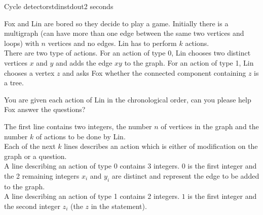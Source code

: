 \begin{problem}{Cycle detector}{stdin}{stdout}{2 seconds}


%

Fox and Lin are bored so they decide to play a game.
Initially there is a multigraph (can have more than one edge between the same two vertices and loops) with $n$ vertices and no edges.
Lin has to perform $k$ actions. \\ 
There are two type of actions.
For an action of type 0, Lin chooses two distinct vertices $x$ and $y$ and adds the edge $xy$ to the graph.
For an action of type 1, Lin chooses a vertex $z$ and asks Fox whether the connected component containing $z$ is a tree.

You are given each action of Lin in the chronological order, can you please help Fox answer the questions?


\InputFile

The first line contains two integers, the number $n$ of vertices in the graph and the number $k$ of actions to be done by Lin.\\
Each of the next $k$ lines describes an action which is either of modification on the graph or a question.\\ 
A line describing an action of type 0 contains 3 integers. $0$ is the first integer and the 2 remaining integers $x_i$ and $y_i$ are distinct and represent the edge to be added to the graph.\\ 
A line describing an action of type 1 contains 2 integers. $1$ is the first integer and the second integer $z_i$ (the $z$ in the statement).


\end{problem}
